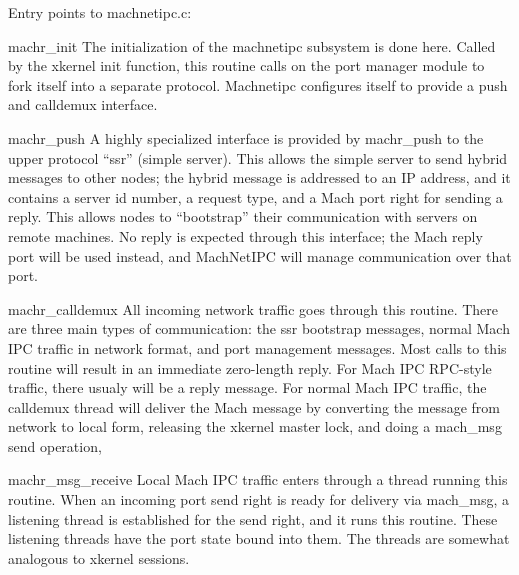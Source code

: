 Entry points to machnetipc.c:
\begin{description}
\item {machr\_init}
The initialization of the machnetipc subsystem is done here.  Called
by the xkernel init function, this routine calls on the port manager
module to fork itself into a separate protocol.  Machnetipc configures
itself to provide a push and calldemux interface.

\item {machr\_push}
A highly specialized interface is provided by machr\_push to the upper
protocol ``ssr'' (simple server).  This allows the simple server to
send hybrid messages to other nodes; the hybrid message is addressed
to an IP address, and it contains a server id number, a request type,
and a Mach port right for sending a reply.  This allows nodes to
``bootstrap'' their communication with servers on remote machines.  No
reply is expected through this interface; the Mach reply port will be
used instead, and MachNetIPC will manage communication over that port.

\item {machr\_calldemux}
All incoming network traffic goes through this routine.  There are
three main types of communication: the ssr bootstrap messages, normal
Mach IPC traffic in network format, and port management messages.
Most calls to this routine will result in an immediate zero-length
reply.  For Mach IPC RPC-style traffic, there usualy will be a reply message.
For normal Mach IPC traffic, the calldemux thread will deliver the
Mach message by converting the message from network to local form,
releasing the xkernel master lock, and doing a mach\_msg send operation,

\item {machr\_msg\_receive}
Local Mach IPC traffic enters through a thread running this
routine.  When an incoming port send right is ready for delivery via
mach\_msg, a listening thread is established for the send right, and
it runs this routine.  These listening threads have the port state
bound into them.  The threads are somewhat analogous to xkernel
sessions.

\end{description}
	
